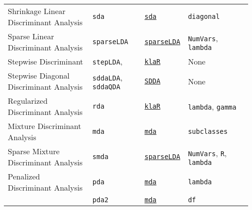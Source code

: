 \documentclass[12pt]{article}
\begin{document}
\begin{landscape}
\begin{longtable}{lllll}
\rowcolor[rgb]{.95, .95, .95}                     
      Shrinkage Linear Discriminant Analysis &
         \texttt{sda} & 
              {\tt \href{http://cran.r-project.org/web/packages/sda/index.html}{sda}}      &          
            \texttt{diagonal}\\  
      
      Sparse Linear Discriminant Analysis&
         \texttt{sparseLDA} & 
              {\tt \href{http://cran.r-project.org/web/packages/sparseLDA/index.html}{sparseLDA}}      &          
            \texttt{NumVars}, \texttt{lambda} \\  

\rowcolor[rgb]{.95, .95, .95}               
       Stepwise Discriminant&
        \texttt{stepLDA}, &
         {\tt \href{http://cran.r-project.org/web/packages/klaR/index.html}{klaR}}   &
        None \\
      
      Stepwise Diagonal Discriminant Analysis&
        \texttt{sddaLDA}, \texttt{sddaQDA}&
         {\tt \href{http://cran.r-project.org/web/packages/SDDA/index.html}{SDDA}}&
        None \\
            
\rowcolor[rgb]{.95, .95, .95}                     
      Regularized Discriminant Analysis &
         \texttt{rda} & 
             {\tt \href{http://cran.r-project.org/web/packages/klaR/index.html}{klaR}}      & 
            \texttt{lambda}, \texttt{gamma} & \\
      
      Mixture Discriminant Analysis &
         \texttt{mda} & 
             {\tt \href{http://cran.r-project.org/web/packages/mda/index.html}{mda}}        & 
            \texttt{subclasses} & \\

\rowcolor[rgb]{.95, .95, .95}         
      Sparse Mixture Discriminant Analysis&
         \texttt{smda} & 
             {\tt \href{http://cran.r-project.org/web/packages/sparseLDA/index.html}{sparseLDA}}        &          
            \texttt{NumVars}, \texttt{R}, \texttt{lambda} \\  
      
      Penalized Discriminant Analysis &
         \texttt{pda} & 
             {\tt \href{http://cran.r-project.org/web/packages/mda/index.html}{mda}}      & 
            \texttt{lambda} & \\
 
        & \texttt{pda2} & 
             {\tt \href{http://cran.r-project.org/web/packages/mda/index.html}{mda}}       & 
            \texttt{df} & \\     
 

\end{longtable}
\end{landscape}
\end{document}
